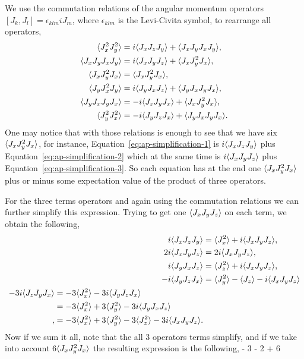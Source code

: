 We use the commutation relations of the angular momentum operators $[J_k,J_l]=\epsilon_{klm} iJ_m$, where $\epsilon_{klm}$ is the Levi-Civita symbol, to rearrange all operators,
\begin{subequations}
\begin{align}
  \langle{J_x^2J_y^2}\rangle & = i\langle{J_xJ_zJ_y}\rangle+\langle{J_xJ_yJ_xJ_y}\rangle,
  \label{eq:ap-simplification-1} \\
  \langle{J_xJ_yJ_xJ_y}\rangle & = i\langle{J_xJ_yJ_z}\rangle+\langle{J_xJ_y^2J_x}\rangle,
  \label{eq:ap-simplification-2} \\
  \langle{J_xJ_y^2J_x}\rangle & = \langle{J_xJ_y^2J_x}\rangle,
  \label{eq:ap-simplification-3} \\
  \langle{J_yJ_x^2J_y}\rangle & = i\langle{J_yJ_xJ_z}\rangle + \langle{J_yJ_xJ_yJ_x}\rangle,
  \label{eq:ap-simplification-4} \\
  \langle{J_yJ_xJ_yJ_x}\rangle & = -i\langle{J_zJ_yJ_x}\rangle + \langle{J_xJ_y^2J_x}\rangle,
  \label{eq:ap-simplification-5} \\
  \langle{J_y^2J_x^2}\rangle & = -i\langle{J_yJ_zJ_x}\rangle + \langle{J_yJ_xJ_yJ_x}\rangle.
  \label{eq:ap-simplification-6}
\end{align}
\end{subequations}
One may notice that with those relations is enough to see that we have six $\langle{J_xJ_y^2J_x}\rangle$, for instance, Equation~\eqref{eq:ap-simplification-1} is $i\langle{J_xJ_zJ_y}\rangle$ plus Equation~\eqref{eq:ap-simplification-2} which at the same time is $i\langle{J_xJ_yJ_z}\rangle$ plus Equation~\eqref{eq:ap-simplification-3}.
So each equation has at the end one $\langle{J_xJ_y^2J_x}\rangle$ plus or minus some expectation value of the product of three operators.

For the three terms operators and again using the commutation relations we can further simplify this expression. Trying to get one $\langle{J_xJ_yJ_z}\rangle$ on each term, we obtain the following,
\begin{subequations}
\begin{align}
  i\langle{J_xJ_zJ_y}\rangle & = \langle{J_x^2}\rangle+i\langle{J_xJ_yJ_z}\rangle,
  \label{eq:ap-last-terms-1} \\
  2i\langle{J_xJ_yJ_z}\rangle & = 2i\langle{J_xJ_yJ_z}\rangle,
  \label{eq:ap-last-term-2} \\
  i\langle{J_yJ_xJ_z}\rangle & = \langle{J_z^2}\rangle+i\langle{J_xJ_yJ_z}\rangle,
  \label{eq:ap-simplification-3} \\
  -i\langle{J_yJ_zJ_x}\rangle & = \langle{J_y^2}\rangle - \langle{J_z}\rangle - i\langle{J_xJ_yJ_z}\rangle \\
\begin{split}
  -3i\langle{J_zJ_yJ_x}\rangle & = -3\langle{J_x^2}\rangle - 3i \langle{J_yJ_zJ_x}\rangle \\
  & = -3\langle{J_x^2}\rangle + 3 \langle{J_y^2}\rangle - 3i\langle{J_yJ_xJ_z}\rangle \\,
  & = -3\langle{J_x^2}\rangle + 3 \langle{J_y^2}\rangle - 3\langle{J_z^2}\rangle
   - 3i \langle{J_xJ_yJ_z}\rangle.
  \label{eq:ap-simplification-4}
\end{split}
\end{align}
\end{subequations}
Now if we sum it all, note that the all 3 operators terms simplify, and if we take into account $6\langle{J_xJ_y^2J_x}\rangle$ the resulting expression is the following,
 - 3  - 2 + 6
\ee

